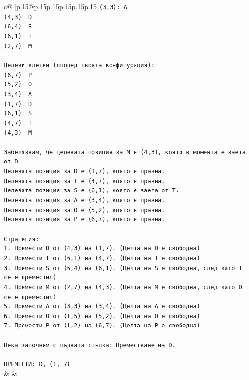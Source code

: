\documentclass{article}
\begin{document}
{\begin{supertabular}{c@{$\;$}|p{.15\linewidth}@{}p{.15\linewidth}p{.15\linewidth}p{.15\linewidth}p{.15\linewidth}p{.15\linewidth}}
{{{\texttt{(3,3): A} \\
\texttt{(4,3): D} \\
\texttt{(6,4): S} \\
\texttt{(6,1): T} \\
\texttt{(2,7): M} \\
\\ 
\texttt{Целеви клетки (според твоята конфигурация):} \\
\texttt{(6,7): P} \\
\texttt{(5,2): O} \\
\texttt{(3,4): A} \\
\texttt{(1,7): D} \\
\texttt{(6,1): S} \\
\texttt{(4,7): T} \\
\texttt{(4,3): M} \\
\\ 
\texttt{Забелязвам, че целевата позиция за M е (4,3), която в момента е заета от D.} \\
\texttt{Целевата позиция за D е (1,7), която е празна.} \\
\texttt{Целевата позиция за T е (4,7), която е празна.} \\
\texttt{Целевата позиция за S е (6,1), която е заета от T.} \\
\texttt{Целевата позиция за A е (3,4), която е празна.} \\
\texttt{Целевата позиция за O е (5,2), която е празна.} \\
\texttt{Целевата позиция за P е (6,7), която е празна.} \\
\\ 
\texttt{Стратегия:} \\
\texttt{1. Премести D от (4,3) на (1,7). (Целта на D е свободна)} \\
\texttt{2. Премести T от (6,1) на (4,7). (Целта на T е свободна)} \\
\texttt{3. Премести S от (6,4) на (6,1). (Целта на S е свободна, след като T се е преместил)} \\
\texttt{4. Премести M от (2,7) на (4,3). (Целта на M е свободна, след като D се е преместил)} \\
\texttt{5. Премести A от (3,3) на (3,4). (Целта на A е свободна)} \\
\texttt{6. Премести O от (1,5) на (5,2). (Целта на O е свободна)} \\
\texttt{7. Премести P от (1,2) на (6,7). (Целта на P е свободна)} \\
\\ 
\texttt{Нека започнем с първата стъпка: Преместване на D.} \\
\\ 
\texttt{ПРЕМЕСТИ: D, (1, 7)} \\
            }
        }
    }
    & & \\ \\


\end{supertabular}}
\end{document}
